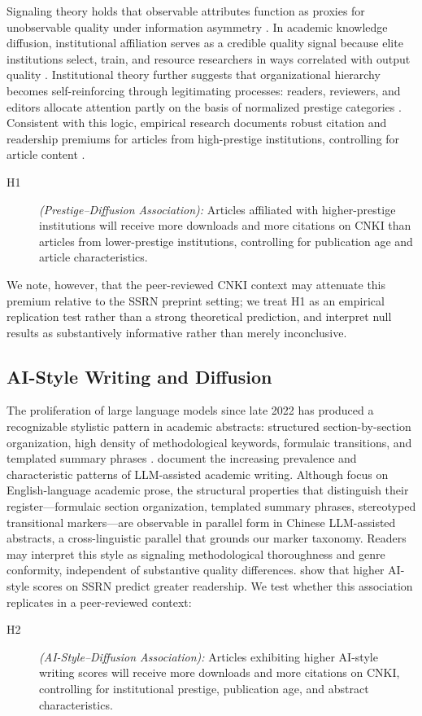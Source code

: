\documentclass[12pt,a4paper]{article}
\begin{document}
Signaling theory holds that observable attributes function as proxies
for unobservable quality under information asymmetry \citep{Spence1973}.
In academic knowledge diffusion, institutional affiliation serves as a
credible quality signal because elite institutions select, train, and
resource researchers in ways correlated with output quality
\citep{Long1979,Lariviere2010}.
Institutional theory further suggests that organizational hierarchy
becomes self-reinforcing through legitimating processes: readers,
reviewers, and editors allocate attention partly on the basis of
normalized prestige categories \citep{DiMaggio1983}.
Consistent with this logic, empirical research documents robust
citation and readership premiums for articles from high-prestige
institutions, controlling for article content \citep{Wang2013}.
\begin{description}
  \item[H1] \textit{(Prestige--Diffusion Association):}
  Articles affiliated with higher-prestige institutions will receive
  more downloads and more citations on CNKI than articles from
  lower-prestige institutions, controlling for publication age
  and article characteristics.
\end{description}
We note, however, that the peer-reviewed CNKI context may attenuate
this premium relative to the SSRN preprint setting; we treat H1 as an
empirical replication test rather than a strong theoretical prediction,
and interpret null results as substantively informative rather than
merely inconclusive.

\subsection{AI-Style Writing and Diffusion}

The proliferation of large language models since late 2022 has produced
a recognizable stylistic pattern in academic abstracts: structured
section-by-section organization, high density of methodological keywords,
formulaic transitions, and templated summary phrases
\citep{Liang2024,Biber2016}.
\citet{Liang2024} document the increasing prevalence and characteristic
patterns of LLM-assisted academic writing.
Although \citet{Biber2016} focus on English-language academic prose,
the structural properties that distinguish their register---formulaic
section organization, templated summary phrases, stereotyped transitional
markers---are observable in parallel form in Chinese LLM-assisted
abstracts, a cross-linguistic parallel that grounds our marker taxonomy.
Readers may interpret this style as signaling methodological
thoroughness and genre conformity, independent of substantive quality
differences.
\citet{JoLi2026} show that higher AI-style scores on SSRN predict
greater readership.
We test whether this association replicates in a peer-reviewed context:
\begin{description}
  \item[H2] \textit{(AI-Style--Diffusion Association):}
  Articles exhibiting higher AI-style writing scores will receive
  more downloads and more citations on CNKI, controlling for
  institutional prestige, publication age, and abstract
  characteristics.
\end{description}
\end{document}
